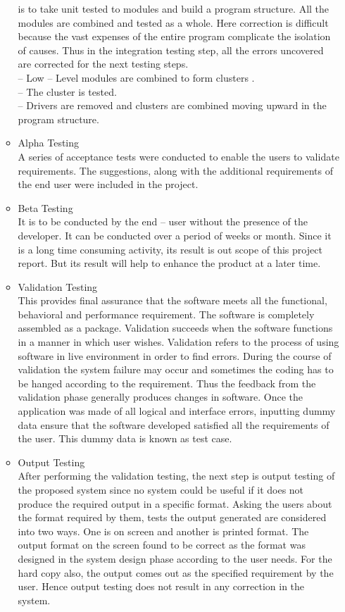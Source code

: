 \documentclass[12pt]{article}
\begin{document}
\begin{enumerate}
\begin{itemize}
is to take unit tested to modules and build a program structure. All the modules are
combined and tested as a whole. Here correction is difficult because the vast expenses
of the entire program complicate the isolation of causes. Thus in the integration testing
step, all the errors uncovered are corrected for the next testing steps.\\
– Low – Level modules are combined to form clusters .\\
– The cluster is tested.\\
– Drivers are removed and clusters are combined moving upward in the program
structure.
\item  Alpha Testing\\
A series of acceptance tests were conducted to enable the users to validate requirements. The suggestions, along with the additional requirements of the end user were
included in the project.
\item Beta Testing\\
It is to be conducted by the end – user without the presence of the developer. It
can be conducted over a period of weeks or month. Since it is a long time consuming
activity, its result is out scope of this project report. But its result will help to enhance the product at a later time.
\item  Validation Testing\\
This provides final assurance that the software meets all the functional, behavioral
and performance requirement. The software is completely assembled as a package.
Validation succeeds when the software functions in a manner in which user wishes.
Validation refers to the process of using software in live environment in order to find
errors. During the course of validation the system failure may occur and sometimes
the coding has to be hanged according to the requirement. Thus the feedback from
the validation phase generally produces changes in software. Once the application was
made of all logical and interface errors, inputting dummy data ensure that the software
developed satisfied all the requirements of the user. This dummy data is known as test
case.
\item Output Testing\\
After performing the validation testing, the next step is output testing of the proposed system since no system could be useful if it does not produce the required output
in a specific format. Asking the users about the format required by them, tests the
output generated are considered into two ways. One is on screen and another is printed
format. The output format on the screen found to be correct as the format was designed
in the system design phase according to the user needs. For the hard copy also, the
output comes out as the specified requirement by the user. Hence output testing does
not result in any correction in the system.
\end{itemize}







\end{enumerate}
\end{document}
